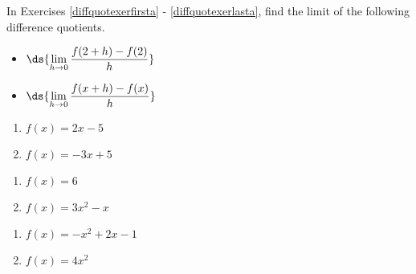 \documentclass{ximera}
\begin{document}
	\author{Stitz-Zeager}


\label{ExercisesforAppDerivatives}
In Exercises \ref{diffquotexerfirsta} - \ref{diffquotexerlasta}, find the limit of the following difference quotients.

\begin{multicols}{2}

\begin{itemize}

\item  $\ds{\lim_{h \rightarrow 0} \dfrac{f(2+h) - f(2)}{h}}$

\item  $\ds{\lim_{h \rightarrow 0} \dfrac{f(x+h) - f(x)}{h}}$

\end{itemize}

\end{multicols}


\begin{multicols}{2}

\begin{enumerate}


\item $f(x) = 2x - 5$ \label{diffquotexerfirsta}
\item $f(x) = -3x + 5$

\setcounter{HW}{\value{enumi}}
\end{enumerate}
\end{multicols}

\begin{multicols}{2}
\begin{enumerate}
\setcounter{enumi}{\value{HW}}

\item $f(x) = 6$
\item $f(x) = 3x^2 - x$

\setcounter{HW}{\value{enumi}}
\end{enumerate}
\end{multicols}

\begin{multicols}{2}
\begin{enumerate}
\setcounter{enumi}{\value{HW}}

\item $f(x) = -x^2 + 2x - 1$
\item\label{diffquotexerlasta}  $f(x) = 4x^2$ 

\setcounter{HW}{\value{enumi}}
\end{enumerate}
\end{multicols}
\end{document}
